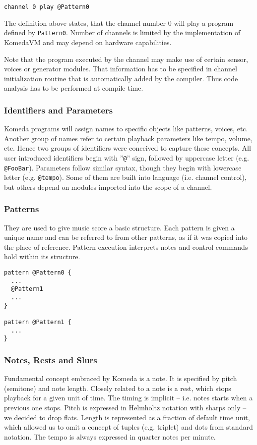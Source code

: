 \documentclass{article}
\begin{document}
\begin{lstlisting}[caption=Channel notation example]
channel 0 play @Pattern0
\end{lstlisting}

The definition above states, that the channel number 0 will play a program
defined by {\tt Pattern0}. Number of channels is limited by the implementation
of KomedaVM and may depend on hardware capabilities.

Note that the program executed by the channel may make use of certain sensor,
voices or generator modules. That information has to be specified in channel
initialization routine that is automatically added by the compiler. Thus code
analysis has to be performed at compile time. 

\subsubsection{Identifiers and Parameters}

Komeda programs will assign names to specific objects like patterns, voices,
etc. Another group of names refer to certain playback parameters like tempo,
volume, etc. Hence two groups of identifiers were conceived to capture these
concepts. All user introduced identifiers begin with ''\texttt{@}'' sign,
followed by uppercase letter (e.g. {\tt @FooBar}). Parameters follow similar
syntax, though they begin with lowercase letter (e.g. {\tt @tempo}). Some of
them are built into language (i.e. channel control), but others depend on
modules imported into the scope of a channel.

\subsubsection{Patterns}
They are used to give music score a basic structure. Each pattern is given a
unique name and can be referred to from other patterns, as if it was copied
into the place of reference. Pattern execution interprets notes and control
commands hold within its structure.

\begin{lstlisting}[caption=Example of pattern invocation]
pattern @Pattern0 {
  ...
  @Pattern1
  ... 
}

pattern @Pattern1 {
  ...
}
\end{lstlisting}

\subsubsection{Notes, Rests and Slurs}
Fundamental concept embraced by Komeda is a note. It is specified by pitch
(semitone) and note length.  Closely related to a note is a rest, which stops
playback for a given unit of time.  The timing is implicit -- i.e. notes starts
when a previous one stops. Pitch is expressed in Helmholtz notation with sharps
only -- we decided to drop flats. Length is represented as a fraction of
default time unit, which allowed us to omit a concept of tuples (e.g. triplet)
and dots from standard notation.  The tempo is always expressed in quarter
notes per minute.
\end{document}
